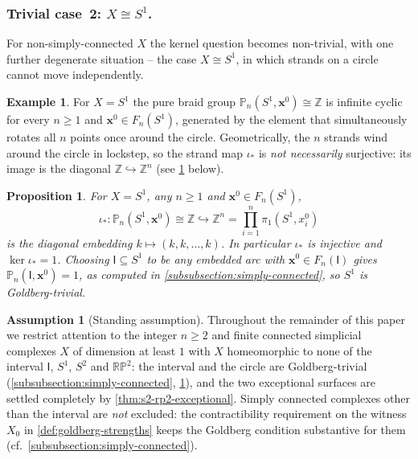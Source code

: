 \documentclass[reqno]{amsart}
\newtheorem{proposition}[theorem]{Proposition}
\theoremstyle{definition}
\newtheorem{example}[theorem]{Example}
\newtheorem{assumption}[theorem]{Assumption}
\newcommand\bfx{\mathbf{x}}
\newcommand{\PB}{\mathbb{P}}
\newcommand{\Z}{\mathbb{Z}}
\newcommand{\RP}{\mathbb{RP}}
\newcommand{\base}{\bfx^0}
\numberwithin{equation}{section}
\begin{document}
\subsubsection{Trivial case~2: \(X \cong S^1\).}

For non-simply-connected \(X\) the kernel question becomes
non-trivial, with one further degenerate situation -- the case
\(X\cong S^1\), in which strands on a circle cannot move
independently.

\begin{example}\label{ex:s1-not-surj}
For \(X = S^1\) the pure braid group
\(\PB_n(S^1,\base)\cong\Z\) is infinite cyclic for every \(n\ge1\) and \(\base\in F_n(S^1)\), generated by the
element that simultaneously rotates all \(n\) points once around
the circle. Geometrically, the \(n\) strands wind around the circle
in lockstep, so the strand map \(\iota_\ast\) is \emph{not necessarily}
surjective: its image is the diagonal \(\Z\hookrightarrow\Z^n\)
(see \cref{prop:s1-case} below).
\end{example}

\begin{proposition}\label{prop:s1-case}
For \(X = S^1\), any \(n\geq 1\) and \(\base\in F_n(S^1)\),
\[
\iota_\ast \colon \PB_n(S^1,\base)\cong\Z\hookrightarrow \Z^{n} = \prod_{i=1}^n\pi_1(S^1,x_i^0)
\]
is the diagonal embedding \(k\mapsto (k,k,\dots,k)\). In particular
\(\iota_\ast\) is injective and \(\ker\iota_\ast = 1\). Choosing
\(\mathsf{I}\subseteq S^1\) to be any embedded arc with
\(\base\in F_n(\mathsf{I})\) gives \(\PB_n(\mathsf{I},\base)=1\),
as computed in \cref{subsubsection:simply-connected}, so
\(S^1\) is Goldberg-trivial.
\end{proposition}

\begin{assumption}[Standing assumption]\label{rem:standing}
Throughout the remainder of this paper we restrict
attention to the integer \(n\geq 2\) and finite connected
simplicial complexes \(X\) of dimension at least \(1\) with
\(X\) homeomorphic to none of the interval \(\mathsf{I}\),
\(S^1\), \(S^2\) and \(\RP^2\): the interval and the circle are
Goldberg-trivial (\cref{subsubsection:simply-connected},
\cref{prop:s1-case}), and the two exceptional surfaces are
settled completely by \cref{thm:s2-rp2-exceptional}. Simply
connected complexes other than the interval are \emph{not}
excluded: the contractibility requirement on the witness \(X_0\)
in \cref{def:goldberg-strengths} keeps the Goldberg
condition substantive for them
(cf.\ \cref{subsubsection:simply-connected}).
\end{assumption}
\end{document}
